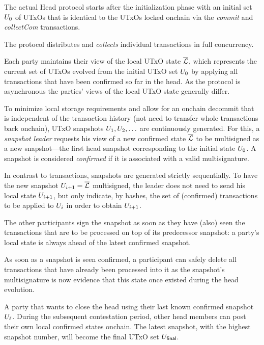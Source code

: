 The actual Head protocol starts after the initialization phase with an initial
set $U_{0}$ of UTxOs that is identical to the UTxOs locked onchain via the
\emph{commit} and \emph{collectCom} transactions.

 The protocol distributes and
\emph{collects} individual transactions in full concurrency.

Each party maintains their view of the local UTxO state $\overline {\mathcal L}$, which
represents the current set of UTxOs evolved from the initial UTxO set $U_{0}$
by applying all transactions that  have been confirmed so far in the head. As the
protocol is asynchronous the parties' views of the local UTxO state generally
differ.

 To minimize local storage requirements and allow for an
onchain decommit that is independent of the transaction history (not need to
transfer whole transactions back onchain), UTxO snapshots $U_1,U_2,\ldots$ are
continuously generated. For this, a \emph{snapshot leader} requests his view of
a new confirmed state $\overline {\mathcal L}$ to be multisigned as a new snapshot---the first
head snapshot corresponding to the initial state $U_{0}$. A snapshot is
considered \emph{confirmed} if it is associated with a valid multisignature.

In contrast to transactions, snapshots are generated strictly sequentially. To
have the new snapshot $U_{i+1}=\overline {\mathcal L}$ multisigned, the leader does not need
to send his local state $U_{i+1}$, but only indicate, by hashes, the set of
(confirmed) transactions to be applied to $U_i$ in order to obtain
$U_{i+1}$.

The other participants sign the snapshot as soon as they have (also) seen the
transactions that are to be processed on top of its predecessor snapshot: a
party's local state is always ahead of the latest confirmed snapshot.

As soon as a snapshot is seen confirmed, a participant can safely
delete all transactions that have already been processed into it as the
snapshot's multisignature is now evidence that this state once existed
during the head evolution.

 A party that wants to close the head using their last known confirmed snapshot $U_\ell$. During the subsequent contestation period, other head members can post their own local confirmed states onchain. The latest snapshot, with the highest snapshot number, will become the final UTxO set $U_{\mathsf{final}}$.

